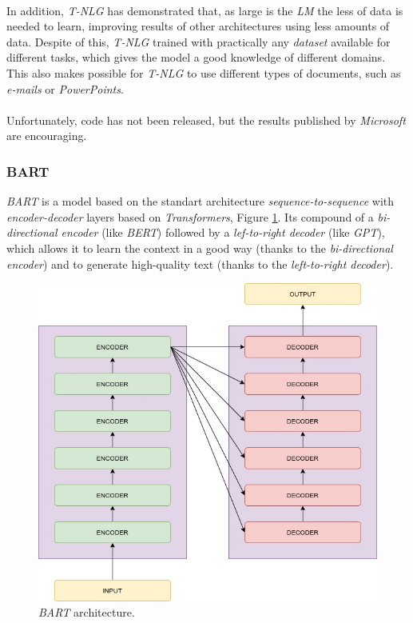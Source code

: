 \paragraph{}
In addition, \emph{T-NLG} has demonstrated that, as large is the \emph{LM} the less of data is needed to learn, improving results of other architectures using less amounts of data. Despite of this, \emph{T-NLG} trained with practically any \emph{dataset} available for different tasks, which gives the model a good knowledge of different domains. This also makes possible for \emph{T-NLG} to use different types of documents, such as \emph{e-mails} or \emph{PowerPoints}.
\paragraph{}
Unfortunately, code has not been released, but the results published by \emph{Microsoft} are encouraging.
\subsubsection{BART}
\noindent \emph{BART} is a model based on the standart architecture \emph{sequence-to-sequence} with \emph{encoder-decoder} layers based on \emph{Transformers}, Figure \ref{fig:bart}\cite{Lewis2019}. Its compound of a \emph{bi-directional encoder} (like \emph{BERT}) followed by a \emph{lef-to-right decoder} (like \emph{GPT}), which allows it to learn the context in a good way (thanks to the \emph{bi-directional encoder}) and to generate high-quality text (thanks to the \emph{left-to-right decoder}).
\begin{figure}[h!]
	\centering
	\includegraphics[scale=0.35]{images/bart}
	\caption{\emph{BART} architecture.}
	\label{fig:bart}
\end{figure}
